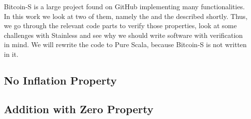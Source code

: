 Bitcoin-S is a large project found on GitHub implementing many functionalities.
In this work we look at two of them, namely the  and the  described shortly.
Thus, we go through the relevant code parts to verify those properties, look at some challenges with Stainless and see why we should write software with verification in mind.
We will rewrite the code to Pure Scala, because Bitcoin-S is not written in it.


\subsection{No Inflation Property}
\label{property_1}



\subsection{Addition with Zero Property}
\label{property_2}


